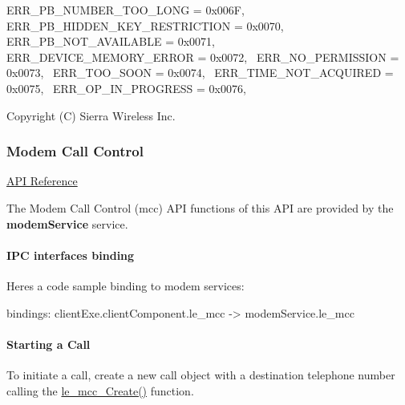 \begin{DoxyItemize}
 E\+R\+R\+\_\+\+P\+B\+\_\+\+N\+U\+M\+B\+E\+R\+\_\+\+T\+O\+O\+\_\+\+L\+O\+NG = 0x006F,~\newline
 E\+R\+R\+\_\+\+P\+B\+\_\+\+H\+I\+D\+D\+E\+N\+\_\+\+K\+E\+Y\+\_\+\+R\+E\+S\+T\+R\+I\+C\+T\+I\+ON = 0x0070,~\newline
 E\+R\+R\+\_\+\+P\+B\+\_\+\+N\+O\+T\+\_\+\+A\+V\+A\+I\+L\+A\+B\+LE = 0x0071,~\newline
 E\+R\+R\+\_\+\+D\+E\+V\+I\+C\+E\+\_\+\+M\+E\+M\+O\+R\+Y\+\_\+\+E\+R\+R\+OR = 0x0072,~\newline
 E\+R\+R\+\_\+\+N\+O\+\_\+\+P\+E\+R\+M\+I\+S\+S\+I\+ON = 0x0073,~\newline
 E\+R\+R\+\_\+\+T\+O\+O\+\_\+\+S\+O\+ON = 0x0074,~\newline
 E\+R\+R\+\_\+\+T\+I\+M\+E\+\_\+\+N\+O\+T\+\_\+\+A\+C\+Q\+U\+I\+R\+ED = 0x0075,~\newline
 E\+R\+R\+\_\+\+O\+P\+\_\+\+I\+N\+\_\+\+P\+R\+O\+G\+R\+E\+SS = 0x0076,~\newline

\end{DoxyItemize}





Copyright (C) Sierra Wireless Inc. \hypertarget{c_mcc}{}\subsubsection{Modem Call Control}\label{c_mcc}
\hyperlink{le__mcc__interface_8h}{A\+PI Reference}





The Modem Call Control (mcc) A\+PI functions of this A\+PI are provided by the {\bfseries modem\+Service} service.\hypertarget{c_mcc_le_mcc_binding}{}\paragraph{I\+P\+C interfaces binding}\label{c_mcc_le_mcc_binding}
Here\textquotesingle{}s a code sample binding to modem services\+: \begin{DoxyVerb}bindings:
{
   clientExe.clientComponent.le_mcc -> modemService.le_mcc
}
\end{DoxyVerb}
\hypertarget{c_mcc_le_mcc_starting_a_call}{}\paragraph{Starting a Call}\label{c_mcc_le_mcc_starting_a_call}
To initiate a call, create a new call object with a destination telephone number calling the \hyperlink{le__mcc__interface_8h_a42130fc6b1d69413a387e3292117b3d3}{le\+\_\+mcc\+\_\+\+Create()} function.

